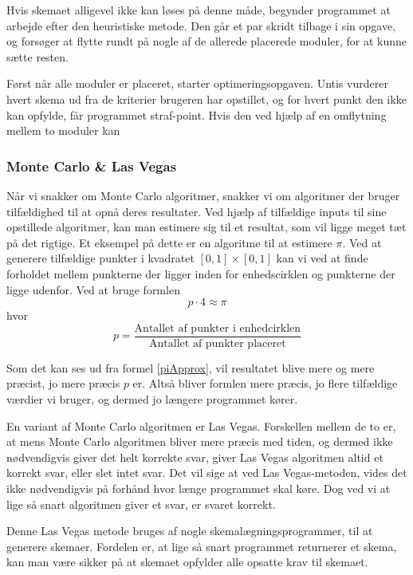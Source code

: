 Hvis skemaet alligevel ikke kan løses på denne måde, begynder programmet at arbejde efter den heuristiske metode. Den går et par skridt tilbage i sin opgave, og forsøger at flytte rundt på nogle af de allerede placerede moduler, for at kunne sætte resten.

Først når alle moduler er placeret, starter optimeringsopgaven. Untis vurderer hvert skema ud fra de kriterier brugeren har opstillet, og for hvert punkt den ikke kan opfylde, får programmet straf-point. Hvis den ved hjælp af en omflytning mellem to moduler kan 

\subsubsection{Monte Carlo \& Las Vegas}
Når vi snakker om Monte Carlo algoritmer, snakker vi om algoritmer der bruger tilfældighed til at opnå deres resultater\cite{mcbook}. Ved hjælp af tilfældige inputs til sine opstillede algoritmer, kan man estimere sig til et resultat, som vil ligge meget tæt på det rigtige. Et eksempel på dette er en algoritme til at estimere $\pi$\cite{MontePi}. Ved at generere tilfældige punkter i kvadratet $[0,1] \times [0,1]$ kan vi ved at finde forholdet mellem punkterne der ligger inden for enhedscirklen og punkterne der ligge udenfor. Ved at bruge formlen
\begin{equation}
	\label{piApprox}
	p \cdot 4 \approx \pi
\end{equation}
hvor 
$$p = \frac{\text{Antallet af punkter i enhedcirklen}}{\text{Antallet af punkter placeret}}$$

Som det kan ses ud fra formel \ref{piApprox}, vil resultatet blive mere og mere præcist, jo mere præcis $p$ er. Altså bliver formlen mere præcis, jo flere tilfældige værdier vi bruger, og dermed jo længere programmet kører.

En variant af Monte Carlo algoritmen er Las Vegas. Forskellen mellem de to er, at mens Monte Carlo algoritmen bliver mere præcis med tiden, og dermed ikke nødvendigvis giver det helt korrekte svar, giver Las Vegas algoritmen altid et korrekt svar, eller slet intet svar. Det vil sige at ved Las Vegas-metoden, vides det ikke nødvendigvis på forhånd hvor længe programmet skal køre. Dog ved vi at lige så snart algoritmen giver et svar, er svaret korrekt.

Denne Las Vegas metode bruges af nogle skemalægningsprogrammer, til at generere skemaer. Fordelen er, at lige så snart programmet returnerer et skema, kan man være sikker på at skemaet opfylder alle opsatte krav til skemaet.